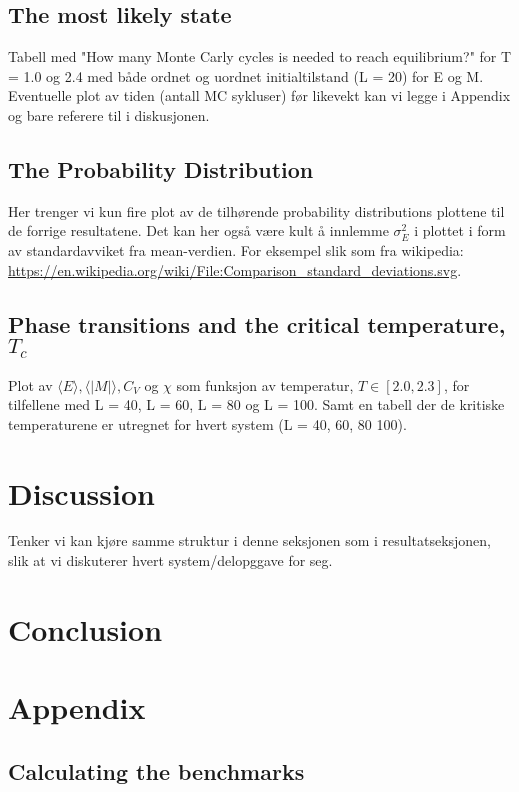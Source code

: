 \documentclass[12pt,english,a4paper]{article}
\begin{document}
\subsection{The most likely state}

Tabell med "How many Monte Carly cycles is needed to reach equilibrium?" for T = 1.0 og 2.4 med både ordnet og uordnet initialtilstand (L = 20) for E og M. Eventuelle plot av tiden (antall MC sykluser) før likevekt kan vi legge i Appendix og bare referere til i diskusjonen.

\subsection{The Probability Distribution}

Her trenger vi kun fire plot av de tilhørende probability distributions plottene til de forrige resultatene. Det kan her også være kult å innlemme $\sigma _E^2$ i plottet i form av standardavviket fra mean-verdien. For eksempel slik som fra wikipedia: \url{https://en.wikipedia.org/wiki/File:Comparison_standard_deviations.svg}.

\subsection{Phase transitions and the critical temperature, $T_c$}

Plot av $\langle E\rangle, \langle |M|\rangle, C_V$ og $\chi$ som funksjon av temperatur, $T \in [2.0,2.3]$, for tilfellene med L = 40, L = 60, L = 80 og L = 100. Samt en tabell der de kritiske temperaturene er utregnet for hvert system (L = 40, 60, 80 100).

\section{Discussion}

Tenker vi kan kjøre samme struktur i denne seksjonen som i resultatseksjonen, slik at vi diskuterer hvert system/delopggave for seg.

\section{Conclusion}

\section{Appendix}

\subsection{Calculating the benchmarks}
\end{document}
